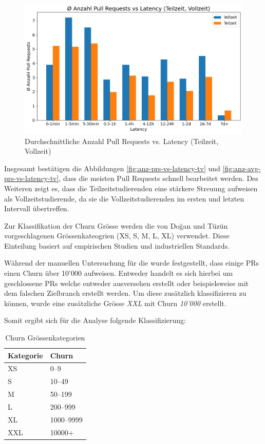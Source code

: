 \begin{figure}[htbp]
    \includegraphics[width=\textwidth]{Figures/anz-avg-prs-vs-latency-tv.png}
    \caption{Durchschnittliche Anzahl Pull Requests vs. Latency (Teilzeit, Vollzeit)}
    \label{fig:anz-avg-prs-vs-latency-tv}
\end{figure}
\newpage
Insgesamt bestätigen die Abbildungen \autoref{fig:anz-prs-vs-latency-tv} und \autoref{fig:anz-avg-prs-vs-latency-tv}, dass die meisten Pull Requests schnell bearbeitet werden. Des Weiteren zeigt es, dass die Teilzeitstudierenden eine stärkere Streuung aufweisen als Vollzeitstudierende, da sie die Vollzeitstudierenden im ersten und letzten Intervall übertreffen.

\newpage
Zur Klassifikation der Churn Grösse werden die von Doğan und Tüzün vorgeschlagenen Grössenkateogrien (XS, S, M, L, XL) verwendet. Diese Einteilung basiert auf empirischen Studien und industriellen Standards. \parencite{dogan_towards_2022}

Während der manuellen Untersuchung für die  wurde festgestellt, dass einige PRs einen Churn über 10'000 aufweisen. Entweder handelt es sich hierbei um geschlossene PRs welche entweder ausversehen erstellt oder beispielsweise mit dem falschen Zielbranch erstellt werden. Um diese zusätzlich klassifizieren zu können, wurde eine zusätzliche Grösse \textit{XXL} mit Churn \textit{10'000} erstellt. 

Somit ergibt sich für die Analyse folgende Klassifizierung: 
\begin{table}[ht]
\caption{Churn Grössenkategorien}
\label{tab:churnkategorien}
\centering
\begin{tabular}{l l}
\toprule
\textbf{Kategorie} & \textbf{Churn} \\
\midrule
XS  & 0--9       \\
S        & 10--49     \\
M        & 50--199    \\
L         & 200--999   \\
XL   & 1000--9999 \\
XXL  & 10000+ \\
\bottomrule
\end{tabular}
\end{table}


